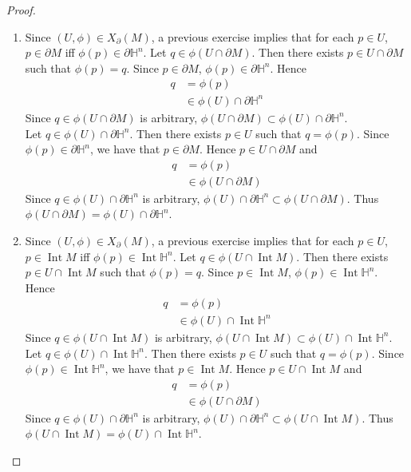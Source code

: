 \documentclass{book}
\theoremstyle{definition}
\renewcommand{\H}{\mathbb{H}}
\DeclareMathOperator{\Int}{Int}
\DeclareMathOperator*{\0}{\mbf{0}}
\DeclareMathOperator*{\1}{\mbf{1}}
\newcommand{\p}{\partial}
\begin{document}
	\begin{proof} \
		\begin{enumerate}
			\item Since $(U, \phi) \in X_{\p}(M)$, a previous exercise implies that for each $p \in U$, $p \in \p M$ iff $\phi(p) \in \p \H^n$. Let $q \in \phi(U \cap \p M)$. Then there exists $p \in U \cap \p M$ such that $\phi(p) = q$. Since $p \in \p M$, $\phi(p) \in \p \H^n$. Hence 
			\begin{align*}
				q 
				& = \phi(p) \\
				& \in \phi(U) \cap \p \H^n
			\end{align*}
			Since $q \in \phi(U \cap \p M)$ is arbitrary, $\phi(U \cap \p M) \subset \phi(U) \cap \p \H^n$. \\
			Let $q \in \phi(U) \cap \p \H^n$. Then there exists $p \in U$ such that $q = \phi(p)$. Since $\phi(p) \in \p \H^n$, we have that $p \in \p M$. Hence $p \in U \cap \p M$ and 
			\begin{align*}
				q 
				& = \phi(p) \\
				& \in \phi(U \cap \p M)
			\end{align*}
			Since $q \in \phi(U) \cap \p \H^n$ is arbitrary, $\phi(U) \cap \p \H^n \subset \phi(U \cap \p M)$. Thus $\phi(U \cap \p M) = \phi(U) \cap \p \H^n$.
			\item Since $(U, \phi) \in X_{\p}(M)$, a previous exercise implies that for each $p \in U$, $p \in \Int M$ iff $\phi(p) \in \Int \H^n$.  Let $q \in \phi(U \cap \Int M)$. Then there exists $p \in U \cap \Int M$ such that $\phi(p) = q$. Since $p \in \Int M$, $\phi(p) \in \Int \H^n$. Hence 
			\begin{align*}
				q 
				& = \phi(p) \\
				& \in \phi(U) \cap \Int \H^n
			\end{align*}
			Since $q \in \phi(U \cap \Int M)$ is arbitrary, $\phi(U \cap \Int M) \subset \phi(U) \cap \Int \H^n$. \\
			Let $q \in \phi(U) \cap \Int \H^n$. Then there exists $p \in U$ such that $q = \phi(p)$. Since $\phi(p) \in \Int \H^n$, we have that $p \in \Int M$. Hence $p \in U \cap \Int M$ and 
			\begin{align*}
				q 
				& = \phi(p) \\
				& \in \phi(U \cap \p M)
			\end{align*}
			Since $q \in \phi(U) \cap \p \H^n$ is arbitrary, $\phi(U) \cap \p \H^n \subset \phi(U \cap \Int M)$. Thus $\phi(U \cap \Int M) = \phi(U) \cap \Int \H^n$.
		\end{enumerate}
	\end{proof}
\end{document}
